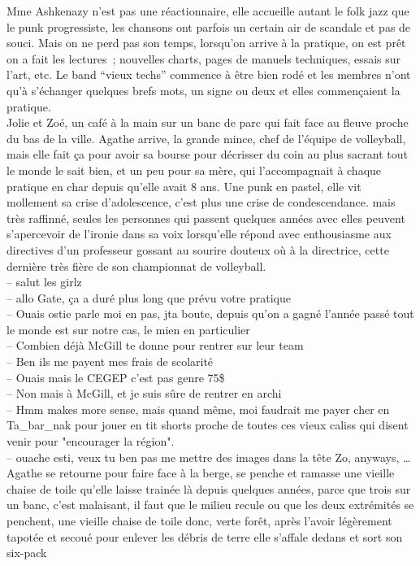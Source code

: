 Mme Ashkenazy n’est pas une réactionnaire, elle accueille autant le folk jazz
que le punk progressiste, les chansons ont parfois un certain air de scandale
et pas de souci. Mais on ne perd pas son temps, lorsqu’on arrive à la pratique,
on est prêt on a fait les lectures ; nouvelles charts, pages de manuels
techniques, essais sur l’art, etc. Le band “vieux techs” commence à être bien
rodé et les membres n’ont qu’à s’échanger quelques brefs mots, un signe ou deux
et elles commençaient la pratique. \\

Jolie et Zoé, un café à la main sur un banc de parc qui fait face au fleuve
proche du bas de la ville. Agathe arrive, la grande mince, chef de l'équipe
de volleyball, mais elle fait ça pour avoir sa bourse pour décrisser du coin 
au plus sacrant tout le monde le sait bien, et un peu pour sa mère, qui 
l'accompagnait à chaque pratique en char depuis qu'elle avait 8 ans. Une punk
en pastel, elle vit mollement sa crise d'adolescence, c'est plus une crise
de condescendance. mais très raffinné, seules les personnes qui passent 
quelques années avec elles peuvent s'apercevoir de l'ironie dans sa voix
lorsqu'elle répond avec enthousiasme  aux directives d'un professeur gossant
au sourire douteux où à la directrice, cette dernière très fière de son
championnat de volleyball.\\[1ex]

-- salut les girlz\\
-- allo Gate, ça a duré plus long que prévu votre pratique\\
-- Ouais ostie parle moi en pas, jta boute, depuis qu'on a gagné
l'année passé tout le monde est sur notre cas, le mien en particulier\\
-- Combien déjà McGill te donne pour rentrer sur leur team \\
-- Ben ils me payent mes frais de scolarité\\
-- Ouais mais le CEGEP c'est pas genre 75\$\\
-- Non mais à McGill, et je suis sûre de rentrer en archi\\
-- Hmm makes more sense, mais quand même, moi faudrait me payer
cher en Ta\_bar\_nak pour jouer en tit shorts proche de toutes ces vieux caliss
qui disent venir pour "encourager la région". \\
-- ouache esti, veux tu ben pas me mettre des images dans la tête Zo,
anyways, \ldots \\[1ex]
Agathe se retourne pour faire face à la berge, se penche et ramasse une
vieille chaise de toile qu'elle laisse trainée là depuis quelques années,
parce que trois sur un banc, c'est malaisant, il faut que le milieu recule
ou que les deux extrémités se penchent, une vieille chaise de toile donc, 
verte forêt, après l'avoir légèrement tapotée et secoué pour enlever les débris 
de terre elle s'affale dedans et sort son six-pack




